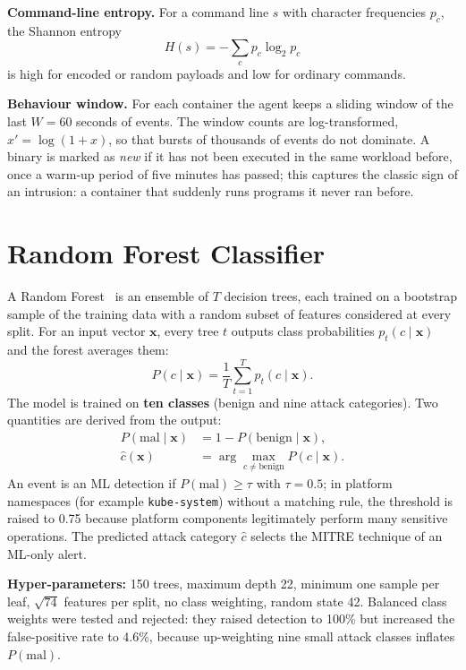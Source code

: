 \textbf{Command-line entropy.} For a command line $s$ with character frequencies $p_c$,
the Shannon entropy
\begin{equation}
H(s) = -\sum_{c} p_c \log_2 p_c
\end{equation}
is high for encoded or random payloads and low for ordinary commands.

\textbf{Behaviour window.} For each container the agent keeps a sliding window of the
last $W = 60$ seconds of events. The window counts are log-transformed,
$x' = \log(1 + x)$, so that bursts of thousands of events do not dominate. A binary is
marked as \emph{new} if it has not been executed in the same workload before, once a
warm-up period of five minutes has passed; this captures the classic sign of an
intrusion: a container that suddenly runs programs it never ran before.

\section{Random Forest Classifier}

A Random Forest~\cite{breiman2001} is an ensemble of $T$ decision trees, each trained on
a bootstrap sample of the training data with a random subset of features considered at
every split. For an input vector $\mathbf{x}$, every tree $t$ outputs class
probabilities $p_t(c \mid \mathbf{x})$ and the forest averages them:
\begin{equation}
P(c \mid \mathbf{x}) = \frac{1}{T} \sum_{t=1}^{T} p_t(c \mid \mathbf{x}).
\end{equation}
The model is trained on \textbf{ten classes} (benign and nine attack categories). Two
quantities are derived from the output:
\begin{align}
P(\mathrm{mal} \mid \mathbf{x}) &= 1 - P(\mathrm{benign} \mid \mathbf{x}), \\
\hat{c}(\mathbf{x}) &= \arg\max_{c \neq \mathrm{benign}} P(c \mid \mathbf{x}).
\end{align}
An event is an ML detection if $P(\mathrm{mal}) \geq \tau$ with $\tau = 0.5$; in
platform namespaces (for example \texttt{kube-system}) without a matching rule, the
threshold is raised to 0.75 because platform components legitimately perform many
sensitive operations. The predicted attack category $\hat{c}$ selects the MITRE
technique of an ML-only alert.

\textbf{Hyper-parameters:} 150 trees, maximum depth 22, minimum one sample per leaf,
$\sqrt{74}$ features per split, no class weighting, random state 42. Balanced class
weights were tested and rejected: they raised detection to 100\% but increased the
false-positive rate to 4.6\%, because up-weighting nine small attack classes inflates
$P(\mathrm{mal})$.

